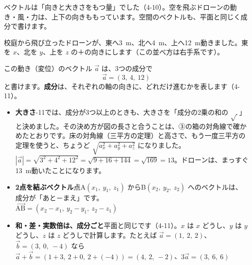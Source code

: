 
\leavevmode\label{bk:4-13:vector}ベクトルは「向きと大きさをもつ量」でした（4-10）。空を飛ぶドローンの動き・風・力は、上下の向きももっています。空間のベクトルも、平面と同じく成分で書けます。

\noindent\begin{minipage}[c]{0.44\linewidth}
\centering
{}
\end{minipage}\hfill
\begin{minipage}[c]{0.52\linewidth}
校庭から飛び立ったドローンが、東へ\qty{3}{m}、北へ\qty{4}{m}、上へ\qty{12}{m}動きました。東を $x$、北を $y$、上を $z$ の＋の向きにします（この並べ方は右手系です）。

この動き（変位）のベクトル $\vec a$ は、3つの成分で
\[ \vec a=(3,\ 4,\ 12) \]
と書けます。\textbf{成分}は、それぞれの軸の向きに、どれだけ進むかを表します（4-11）。
\end{minipage}

\par\vspace{4pt}
\begin{itemize}[leftmargin=1.2\zw, itemsep=3pt, topsep=2pt, label={\color{\bkTT}●}]
\item \textbf{大きさ}-11では、成分が3つ以上のときも、大きさを「成分の2乗の和の $\sqrt{\ }$」と決めました。その決め方が図の長さと合うことは、③の箱の対角線で確かめたとおりです。床の対角線（三平方の定理）と高さで、もう一度三平方の定理を使うと、ちょうど $\sqrt{a_x^2+a_y^2+a_z^2}$ になりました。\\
$|\vec a|=\sqrt{3^2+4^2+12^2}=\sqrt{9+16+144}=\sqrt{169}=13$。ドローンは、まっすぐ\qty{13}{m}動いたことになります。
\item \textbf{2点を結ぶベクトル}\quad 点A$(x_1,\ y_1,\ z_1)$ からB$(x_2,\ y_2,\ z_2)$ へのベクトルは、成分が「あと－まえ」です。\\
$\overrightarrow{\mathrm{AB}}=(x_2-x_1,\ y_2-y_1,\ z_2-z_1)$
\item \textbf{和・差・実数倍は、成分ごと}\quad 平面と同じです（4-11）。$x$ は $x$ どうし、$y$ は $y$ どうし、$z$ は $z$ どうしで計算します。たとえば $\vec a=(1,\ 2,\ 2)$、$\vec b=(3,\ 0,\ -4)$ なら\\
$\vec a+\vec b=(1+3,\ 2+0,\ 2+(-4))=(4,\ 2,\ -2)$、\quad $3\vec a=(3,\ 6,\ 6)$
\end{itemize}


